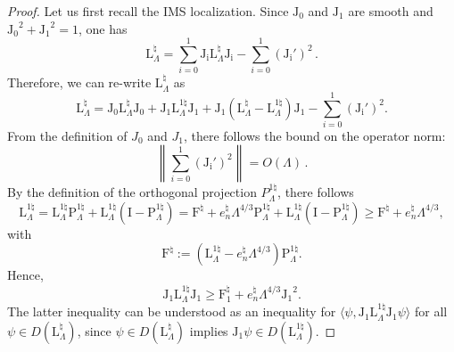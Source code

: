 \documentclass[a4paper,11pt,reqno]{amsart}
\theoremstyle{definition}
\numberwithin{equation}{section}
\newcommand{\Lrm}{\mathrm{L}}
\newcommand{\fer}{\text{\rm f}}
\newcommand{\bosfer}{{\natural}}
\begin{document}
\begin{proof}
Let us first recall the IMS localization. Since  $\mathrm{J_0}$ and $\mathrm{J_1}$ are smooth and  $\mathrm{J_0}^2+\mathrm{J_1}^2=1$, one has
\begin{equation*}%
    \Lrm_{\Lambda}^{\bosfer} = \sum_{i=0}^{1} \mathrm{J_i} \Lrm_\Lambda^\bosfer  \mathrm{J_i} - \sum_{i=0}^{1}\left( \mathrm{J_i}'\right)^2 \, .
\end{equation*}
Therefore, we can re-write  $\Lrm_\Lambda^\bosfer$ as
    \begin{equation}\label{rewritten}
        \Lrm_\Lambda^\bosfer = \mathrm{J_0} \Lrm_\Lambda^\bosfer  \mathrm{J_0} + \mathrm{J_1}  \Lrm_\Lambda^{1\bosfer} \mathrm{J_1}+ \mathrm{J_1}\left( \Lrm_\Lambda^\bosfer  -\Lrm_\Lambda^{1\bosfer}\right) \mathrm{J_1}-\sum_{i=0}^1 \left( \mathrm{J_i}'\right)^2.
    \end{equation}
From the definition of $J_0$ and $J_1$, there follows the  bound on the operator norm:
 \begin{equation}\label{grad_cutoff}
        \left\|\sum_{i=0}^{1}\left( \mathrm{J_i}'\right)^2\right\| = O(\Lambda) \, .
  \end{equation}
By the definition of the orthogonal projection $P_\Lambda^{1\bosfer}$, there follows 
\begin{equation*}
  \Lrm^{1\bosfer}_\Lambda  =  \Lrm^{1\bosfer}_\Lambda \mathrm{P}^{1\bosfer}_{\Lambda} + \Lrm^{1\bosfer}_\Lambda\left(\mathrm{I}-\mathrm{P}^{1\bosfer}_{\Lambda}\right)
      =  {\mathrm{F}}^\bosfer  + e^\bosfer_{n} \Lambda^{4/3}\mathrm{P}^{1\bosfer}_{\Lambda}   + \Lrm^{1\bosfer}_\Lambda\left(\mathrm{I}-\mathrm{P}^{1\bosfer}_{\Lambda}\right) \geq 
       {\mathrm{F}}^\bosfer  + e^\bosfer_{n} \Lambda^{4/3},
\end{equation*}
    with 
    \begin{equation*}%
   {\mathrm{F}^\bosfer} := (\Lrm^{1\bosfer}_{\Lambda}- e^\bosfer_{n}\Lambda^{4/3})\mathrm{P}^{1\bosfer}_{\Lambda} .
\end{equation*}
Hence, 
    \begin{equation} \label{3}
    \mathrm{J_1}  \Lrm^{1\bosfer}_\Lambda \mathrm{J_1}  \geq {\mathrm{F}^\bosfer_1} + e^\bosfer_{n} \Lambda^{4/3} \mathrm{J_1}^2.
    \end{equation}
The latter inequality can be understood as an inequality for $\langle\psi,    \mathrm{J_1}  \Lrm^{1\bosfer}_\Lambda \mathrm{J_1}\psi\rangle$ for all $\psi \in D(\Lrm_\Lambda^\bosfer)$, since $\psi \in D(\Lrm_\Lambda^\bosfer)$ implies $ \mathrm{J_1}\psi \in D(\Lrm_\Lambda^{1\bosfer})$.


\end{proof}
\end{document}
